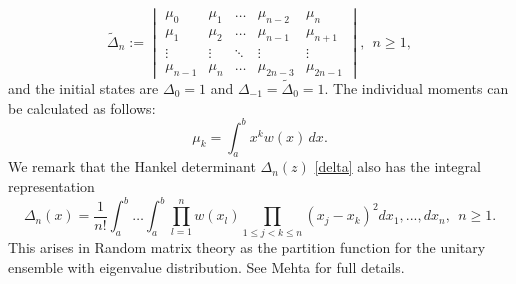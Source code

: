 \documentclass[12pt]{article}
\numberwithin{figure}{section}
\numberwithin{equation}{section}
\numberwithin{table}{section}
\begin{document}
\begin{equation}\widetilde\Delta_n:=
 \begin{vmatrix}
\mu_{0} & \mu_1  &\hdots& \mu_{n-2} & \mu_{n} \\
\mu_1 & \mu_2  &\hdots& \mu_{n-1} & \mu_{n+1}  \\
\vdots &\vdots  & \ddots & \vdots &\vdots \\
\mu_{n-1} & \mu_n  &\hdots& \mu_{2n-3} & \mu_{2n-1}
 \end{vmatrix},~~n\geq1,
 \label{deltawidetilde}
\end{equation}
and the initial states are $\Delta_0=1$ and $\Delta_{-1}=\widetilde\Delta_0=1$.
The individual moments can be calculated as follows:
\begin{equation}
\mu_k=\int^b_ax^kw(x)\,dx.\label{muk}
\end{equation}
We remark that the Hankel determinant $\Delta_n(z)$ \eqref{delta} also has the integral representation
\begin{equation}
\Delta_n(x)=\frac{1}{n!}\int^b_a\dots\int^b_a\prod^n_{l=1}w(x_l)\!\!\!\!\!\prod_{1\leq j<k\leq n}\!\!\!\!\!(x_j-x_k)^2dx_1,...,dx_n,~~n\geq1.
\end{equation}
This arises in Random matrix theory as the partition function for the unitary ensemble with eigenvalue
distribution. See Mehta \cite{Mehta} for full details.
\end{document}
